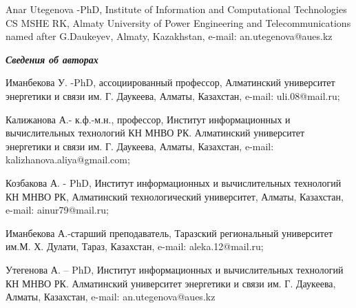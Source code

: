 Anar Utegenova -PhD, Institute of Information and Computational
Technologies CS MSHE RK, Almaty University of Power Engineering and
Telecommunications named after G.Daukeyev, Almaty, Kazakhstan, e-mail:
an.utegenova@aues.kz

\emph{{\bfseries Сведения об авторах}}

Иманбекова У. -PhD, ассоциированный профессор, Алматинский университет
энергетики и связи им. Г. Даукеева, Алматы, Казахстан, e-mail:
uli.08@mail.ru;

Калижанова А.- к.ф.-м.н., профессор, Институт информационных и
вычислительных технологий КН МНВО РК. Алматинский университет энергетики
и связи им. Г. Даукеева, Алматы, Казахстан, e-mail:
kalizhanova.aliya@gmail.com;

Козбакова А. - PhD, Институт информационных и вычислительных технологий
КН МНВО РК, Алматинский технологический университет, Алматы, Казахстан,
e-mail: ainur79@mail.ru;

Иманбекова А.-старший преподаватель, Таразский региональный университет
им.М. Х. Дулати, Тараз, Казахстан, e-mail: aleka.12@mail.ru;

Утегенова А. -- PhD, Институт информационных и вычислительных технологий
КН МНВО РК. Алматинский университет энергетики и связи им. Г. Даукеева,
Алматы, Казахстан, e-mail: an.utegenova@aues.kz
